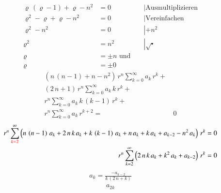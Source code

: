 \begin{refsection}
\begin{align*}
	\varrho \, \left( \varrho -1 \right) + \varrho - n^2 &= 0 && \left| \text{Ausmultiplizieren} \right. \\
	\varrho ^2 - \varrho + \varrho -n^2 &= 0 && \left| \text{Vereinfachen} \right.\\
	\varrho ^2 - n^2 &= 0 && \left| +n^2 \right.\\
	\varrho ^2 &= n^2 && \left| \sqrt{\centerdot} \right. \\
	\varrho &= \pm n \text{ und } \\
	\varrho &= \pm 0 %
\end{align*}
\begin{align*}
	\left(
	n \, \left( n - 1 \right)
	+
	n
	-
	n^2
	\right)
	\, r^{n}
	\sum_{k=0}^{\infty} a_k \, r^k
	+ \\
	\left(	
	2 \, n
	+
	1
	\right)
	\, r^{n}
	\sum_{k=0}^{\infty} a_k \, k \, r^k
	+ \\
	r^{n}
	\sum_{k=0}^{\infty} a_k \, k \, \left( k - 1 \right) \, r^k
	+ \\
	r^{n}
	\sum_{k=0}^{\infty} a_k \, r^{k + 2}
	= & \, 0
\end{align*}
\begin{align*}
	r^n
	\sum_{\textcolor{red}{k=2}}^{\infty}
	\left( n \, \left( n - 1 \right) \, a_k
	+
	2 \, n \, k \, a_k
	+
	k \, \left( k - 1 \right) \, a_k
	+
	n \, a_k
	+
	k \, a_k
	+
	a_{k-2}
	-
	n^2 \, a_k
	\right)
	\, r^k
	= 0 \\
	r^n
	\sum_{k=2}^{\infty}
	\left(
	2 \, n \, k \, a_k
	+
	k^2 \, a_k
	+
	a_{k - 2}
	\right)
	\, r^k
	= 0
\end{align*}
\begin{align}
	a_k
	=
	\frac
	{
		-a_{k - 2}
	}{
		k \, \left( 2 \, n + k \right)	
	}
	\label{eq:bessel_koeffreq}
\end{align}
\begin{align*}
	a_{2k}

\end{align*}
\end{refsection}
